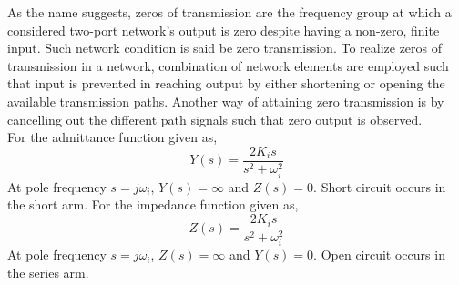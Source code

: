 As the name suggests, zeros of transmission are the frequency group at which a considered two-port network's output is zero despite having a non-zero, finite input. Such network condition is said be zero transmission. To realize zeros of transmission in a network, combination of network elements are employed such that input is prevented in reaching output by either shortening or opening the available transmission paths. Another way of attaining zero transmission is by cancelling out the different path signals such that zero output is observed.\\
For the admittance function given as,
\begin{equation*}
    Y(s)=\frac{2K_is}{s^2+\omega_i^2}
\end{equation*}
At pole frequency $s=j\omega_i$, $Y(s)=\infty$ and $Z(s)=0$. Short circuit occurs in the short arm. 
For the impedance function given as,
\begin{equation*}
    Z(s)=\frac{2K_is}{s^2+\omega_i^2}
\end{equation*}
At pole frequency $s=j\omega_i$, $Z(s)=\infty$ and $Y(s)=0$. Open circuit occurs in the series arm. 